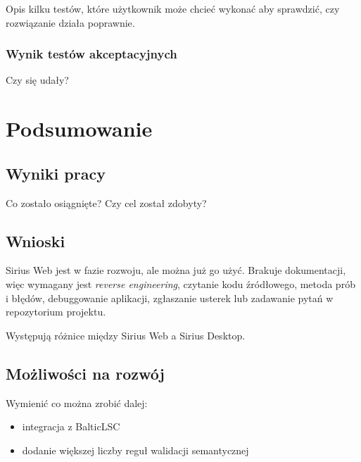 Opis kilku testów, które użytkownik może chcieć wykonać aby sprawdzić, czy
rozwiązanie działa poprawnie.

\subsection{Wynik testów akceptacyjnych}

Czy się udały?

\chapter{Podsumowanie}

\section{Wyniki pracy}

Co zostało osiągnięte? Czy cel został zdobyty?

\section{Wnioski}

Sirius Web jest w fazie rozwoju, ale można już go użyć. Brakuje dokumentacji,
więc wymagany jest \textit{reverse engineering}, czytanie kodu źródłowego,
metoda prób i błędów, debuggowanie aplikacji, zgłaszanie usterek lub zadawanie
pytań w repozytorium projektu.

Występują różnice między Sirius Web a Sirius Desktop.

\section{Możliwości na rozwój}

Wymienić co można zrobić dalej:

\begin{itemize}
	\item integracja z BalticLSC
	\item dodanie większej liczby reguł walidacji semantycznej
\end{itemize}
